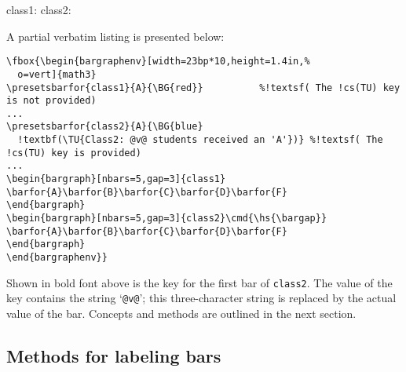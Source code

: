 \documentclass{article}
\edef\amtIndent{\the\parindent}
\begin{document}
\begin{minipage}[c]{222pt}
class1: \cgBdry[.5em]
  \vcgBdry[4bp]
class2: \cgBdry[.5em]
\end{minipage}\cgBdry[.5em]
\cgBdry[.5em]
\vcgBdry[6pt]
A partial verbatim listing is presented below:
\begin{Verbatim}[xleftmargin=\amtIndent,fontsize=\small,commandchars={!()}]
\fbox{\begin{bargraphenv}[width=23bp*10,height=1.4in,%
  o=vert]{math3}
\presetsbarfor{class1}{A}{\BG{red}}          %!textsf( The !cs(TU) key is not provided)
...
\presetsbarfor{class2}{A}{\BG{blue}
  !textbf(\TU{Class2: @v@ students received an 'A'})} %!textsf( The !cs(TU) key is provided)
...
\begin{bargraph}[nbars=5,gap=3]{class1}
\barfor{A}\barfor{B}\barfor{C}\barfor{D}\barfor{F}
\end{bargraph}
\begin{bargraph}[nbars=5,gap=3]{class2}\cmd{\hs{\bargap}}
\barfor{A}\barfor{B}\barfor{C}\barfor{D}\barfor{F}
\end{bargraph}
\end{bargraphenv}}
\end{Verbatim}
Shown in bold font above is the  key for the first bar of
\texttt{class2}. The value of the  key contains the string
`\texttt{@v@}'; this three-character string is replaced by the actual value
of the bar. Concepts and methods are outlined in the next section.

\subsection{Methods for labeling bars}
\end{document}
